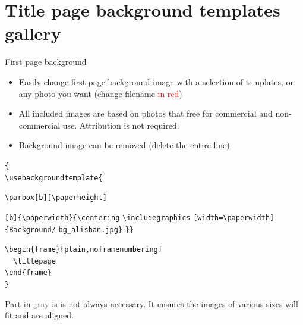 \documentclass[10pt,t]{beamer}
\begin{document}
\section{Title page background templates gallery}
\begin{frame}[fragile]{First page background}\label{background_image}
    \begin{itemize}
        \item Easily change first page background image with a selection of templates, or any photo you want (change filename \textcolor{red}{in red})
        \item All included images are based on photos that free for commercial and non-commercial use. Attribution is not required.
        \item Background image can be removed (delete the entire line)
    \end{itemize}
    
  \vspace{6pt}  
\verb+{+ \\

\verb+\usebackgroundtemplate{+{\color{gray} \verb+\parbox[b][\paperheight]+

    \verb+[b]{\paperwidth}{\centering+
\color{black}\verb+\includegraphics+
\color{gray} \verb+[width=\paperwidth]+\color{black}\verb+{Background/+\color{red} \verb+bg_alishan.jpg+\color{black}\verb+}+\color{gray} \verb+}+\color{black}\verb+}+ 
}

\smallskip
\verb+\begin{frame}[plain,noframenumbering]+ \\
\verb+  \titlepage+ \\
\verb+\end{frame}+ \\
\verb+}+

\vspace{12pt}  
\footnotesize{Part in \textcolor{gray}{gray} is is not always necessary. It ensures the images of various sizes will fit and are aligned.}
\end{frame}
\end{document}
